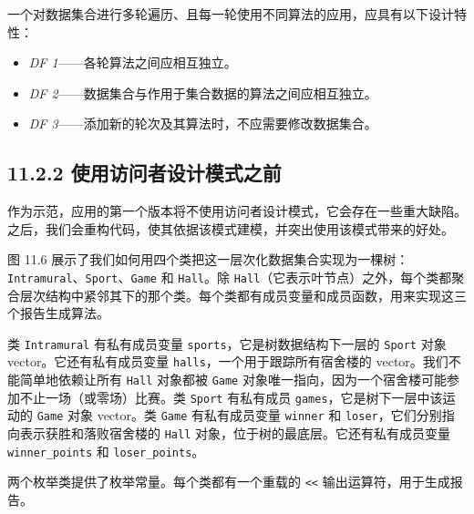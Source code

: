 一个对数据集合进行多轮遍历、且每一轮使用不同算法的应用，应具有以下设计特性：

\begin{itemize}
\item \emph{DF 1}——各轮算法之间应相互独立。
\item \emph{DF 2}——数据集合与作用于集合数据的算法之间应相互独立。
\item \emph{DF 3}——添加新的轮次及其算法时，不应需要修改数据集合。
\end{itemize}

\subsection{11.2.2 使用访问者设计模式之前}

作为示范，应用的第一个版本将不使用访问者设计模式，它会存在一些重大缺陷。之后，我们会重构代码，使其依据该模式建模，并突出使用该模式带来的好处。

图 11.6 展示了我们如何用四个类把这一层次化数据集合实现为一棵树：\texttt{Intramural}、\texttt{Sport}、\texttt{Game} 和 \texttt{Hall}。除 \texttt{Hall}（它表示叶节点）之外，每个类都聚合层次结构中紧邻其下的那个类。每个类都有成员变量和成员函数，用来实现这三个报告生成算法。


类 \texttt{Intramural} 有私有成员变量 \texttt{sports}，它是树数据结构下一层的 \texttt{Sport} 对象 vector。它还有私有成员变量 \texttt{halls}，一个用于跟踪所有宿舍楼的 vector。我们不能简单地依赖让所有 \texttt{Hall} 对象都被 \texttt{Game} 对象唯一指向，因为一个宿舍楼可能参加不止一场（或零场）比赛。类 \texttt{Sport} 有私有成员 \texttt{games}，它是树下一层中该运动的 \texttt{Game} 对象 vector。类 \texttt{Game} 有私有成员变量 \texttt{winner} 和 \texttt{loser}，它们分别指向表示获胜和落败宿舍楼的 \texttt{Hall} 对象，位于树的最底层。它还有私有成员变量 \texttt{winner\_\allowbreak{}points} 和 \texttt{loser\_\allowbreak{}points}。

两个枚举类提供了枚举常量。每个类都有一个重载的 \texttt{<<} 输出运算符，用于生成报告。

